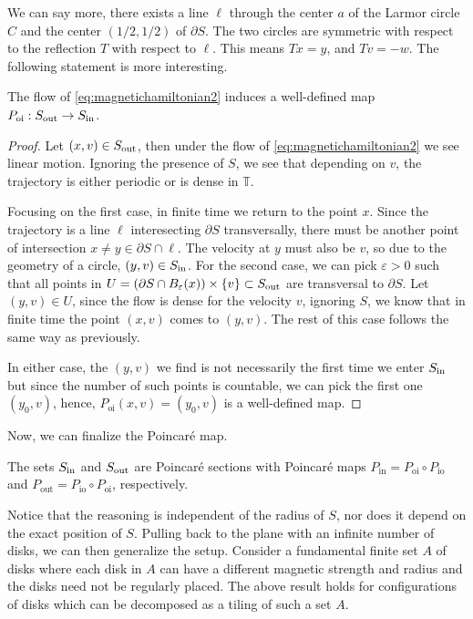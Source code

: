 We can say more, there exists a line $\ell$ through the center $a$ of the Larmor circle $C$ and the center $(1/2,1/2)$ of $\partial S$. The two circles are symmetric with respect to the reflection $T$ with respect to $\ell$. This means $Tx=y$, and $Tv = -w$. The following statement is more interesting.

\begin{lemma}
The flow of \eqref{eq:magnetichamiltonian2} induces a well-defined map $P_\text{oi}:S_\text{out}\to S_\text{in}$.
\end{lemma}
\begin{proof}
Let $(x,v)\in S_\text{out}$, then under the flow of \eqref{eq:magnetichamiltonian2} we see linear motion. Ignoring the presence of $S$, we see that depending on $v$, the trajectory is either periodic or is dense in $\mathbb T$.

Focusing on the first case, in finite time we return to the point $x$. Since the trajectory is a line $\ell$ interesecting $\partial S$ transversally, there must be another point of intersection $x\neq y\in\partial S\cap\ell$. The velocity at $y$ must also be $v$, so due to the geometry of a circle, $(y,v)\in S_\text{in}$. For the second case, we can pick $\varepsilon>0$ such that all points in $U=(\partial S\cap B_\varepsilon(x))\times\{v\}\subset S_\text{out}$ are transversal to $\partial S$. Let $(y,v)\in U$, since the flow is dense for the velocity $v$, ignoring $S$, we know that in finite time the point $(x,v)$ comes to $(y,v)$. The rest of this case follows the same way as previously. 

In either case, the $(y,v)$ we find is not necessarily the first time we enter $S_\text{in}$ but since the number of such points is countable, we can pick the first one $(y_0,v)$, hence, $P_\text{oi}(x,v) = (y_0,v)$ is a well-defined map.
\end{proof}

Now, we can finalize the Poincar\'e map.

\begin{proposition}
The sets $S_\text{in}$ and $S_\text{out}$ are Poincar\'e sections with Poincar\'e maps $P_\text{in} = P_\text{oi}\circ P_\text{io}$ and $P_\text{out}= P_\text{io}\circ P_\text{oi}$, respectively.
\end{proposition}

Notice that the reasoning is independent of the radius of $S$, nor does it depend on the exact position of $S$. Pulling back to the plane with an infinite number of disks, we can then generalize the setup. Consider a fundamental finite set $A$ of disks where each disk in $A$ can have a different magnetic strength and radius and the disks need not be regularly placed. The above result holds for configurations of disks which can be decomposed as a tiling of such a set $A$.

